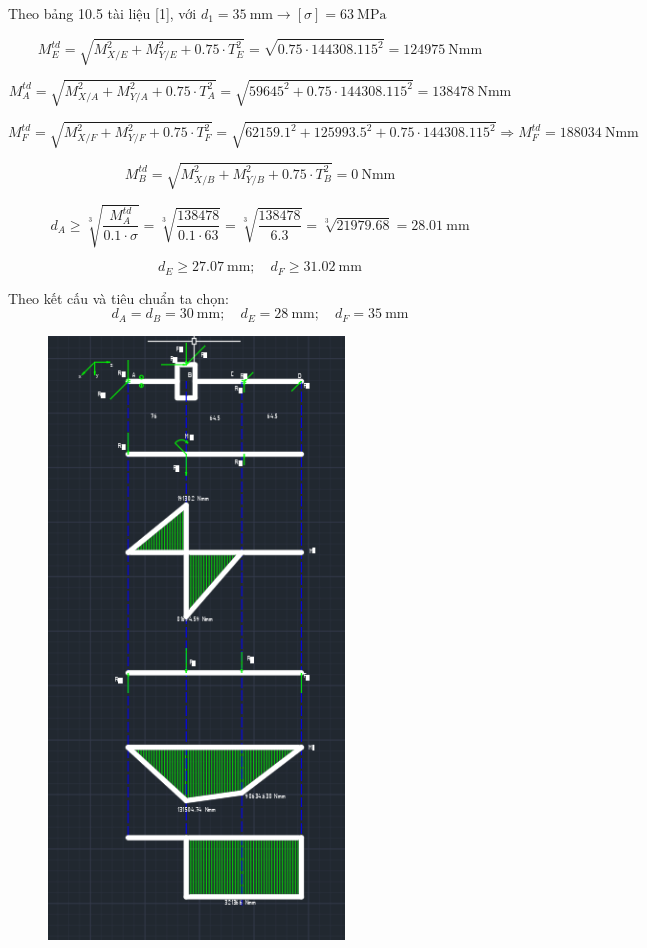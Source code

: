 Theo bảng 10.5 tài liệu [1], với $d_1 = 35\ \text{mm} \rightarrow [\sigma] = 63\ \text{MPa}$

\[
    M_E^{td} 
    = \sqrt{M_{X/E}^2 + M_{Y/E}^2 + 0.75 \cdot T_E^2} 
    = \sqrt{0.75 \cdot 144308.115^2} 
    = 124975\ \text{Nmm}
\]

\[
    M_A^{td} 
    = \sqrt{M_{X/A}^2 + M_{Y/A}^2 + 0.75 \cdot T_A^2} 
    = \sqrt{59645^2 + 0.75 \cdot 144308.115^2} 
    = 138478\ \text{Nmm}
\]

\[
    M_F^{td} 
    = \sqrt{M_{X/F}^2 + M_{Y/F}^2 + 0.75 \cdot T_F^2} 
    = \sqrt{62159.1^2 + 125993.5^2 + 0.75 \cdot 144308.115^2}
    \Rightarrow M_F^{td} = 188034\ \text{Nmm}
\]

\[
    M_B^{td} 
    = \sqrt{M_{X/B}^2 + M_{Y/B}^2 + 0.75 \cdot T_B^2} 
    = 0\ \text{Nmm}
\]

\[
    d_A \ge \sqrt[3]{\frac{M_A^{td}}{0.1 \cdot \sigma}} 
        = \sqrt[3]{\frac{138478}{0.1 \cdot 63}} 
        = \sqrt[3]{\frac{138478}{6.3}} 
        = \sqrt[3]{21979.68} 
        = 28.01\ \text{mm}
\]

\[
    d_E \ge 27.07\ \text{mm}; \quad d_F \ge 31.02\ \text{mm}
\]

Theo kết cấu và tiêu chuẩn ta chọn:
\[
    d_A = d_B = 30\ \text{mm}; \quad d_E = 28\ \text{mm}; \quad d_F = 35\ \text{mm}
\]
\begin{figure}[H]
    \centering
    \includegraphics[width=0.7\textwidth]{pictures/momen1.png}
\end{figure}

